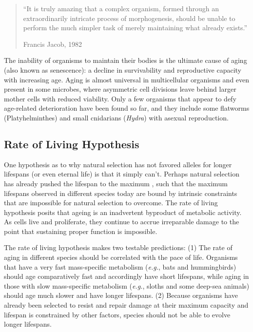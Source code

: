 \documentclass[
]{book}
\begin{document}
\begin{quote}
``It is truly amazing that a complex organism, formed through an extraordinarily intricate process of morphogenesis, should be unable to perform the much simpler task of merely maintaining what already exists.''

Francis Jacob, 1982
\end{quote}

The inability of organisms to maintain their bodies is the ultimate cause of aging (also known as senescence): a decline in survivability and reproductive capacity with increasing age. Aging is almost universal in multicellular organisms and even present in some microbes, where asymmetric cell divisions leave behind larger mother cells with reduced viability. Only a few organisms that appear to defy age-related deterioration have been found so far, and they include some flatworms (Platyhelminthes) and small cnidarians (\emph{Hydra}) with asexual reproduction.

\hypertarget{rate-of-living-hypothesis}{%
\subsection{Rate of Living Hypothesis}\label{rate-of-living-hypothesis}}

One hypothesis as to why natural selection has not favored alleles for longer lifespans (or even eternal life) is that it simply can't. Perhaps natural selection has already pushed the lifespan to the maximum , such that the maximum lifespans observed in different species today are bound by intrinsic constraints that are impossible for natural selection to overcome. The rate of living hypothesis posits that ageing is an inadvertent byproduct of metabolic activity. As cells live and proliferate, they continue to accrue irreparable damage to the point that sustaining proper function is impossible.

The rate of living hypothesis makes two testable predictions: (1) The rate of aging in different species should be correlated with the pace of life. Organisms that have a very fast mass-specific metabolism (\emph{e.g.}, bats and hummingbirds) should age comparatively fast and accordingly have short lifespans, while aging in those with slow mass-specific metabolism (\emph{e.g.}, sloths and some deep-sea animals) should age much slower and have longer lifespans. (2) Because organisms have already been selected to resist and repair damage at their maximum capacity and lifespan is constrained by other factors, species should not be able to evolve longer lifespans.
\end{document}
